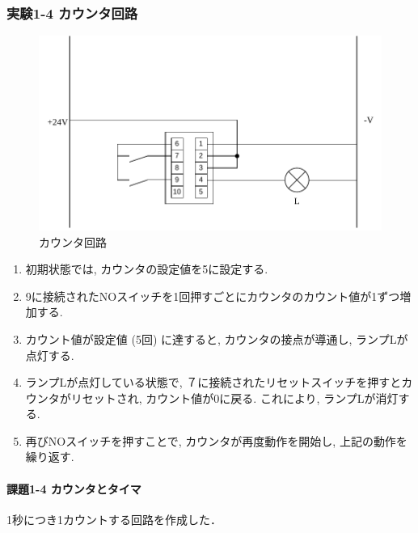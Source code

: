 \subsubsection{実験1-4 カウンタ回路}

\begin{figure}[H]
  \centering
  \includegraphics[scale=0.5]{sozai/3.pdf}
  \caption{カウンタ回路}
\end{figure}

\begin{enumerate}
  \item 初期状態では, カウンタの設定値を5に設定する.
  \item 9に接続されたNOスイッチを1回押すごとにカウンタのカウント値が1ずつ増加する.
  \item カウント値が設定値 (5回) に達すると, カウンタの接点が導通し, ランプLが点灯する.
  \item ランプLが点灯している状態で, ７に接続されたリセットスイッチを押すとカウンタがリセットされ, カウント値が0に戻る. これにより, ランプLが消灯する.
  \item 再びNOスイッチを押すことで, カウンタが再度動作を開始し, 上記の動作を繰り返す.
\end{enumerate}


\paragraph{課題1-4 カウンタとタイマ}
1秒につき1カウントする回路を作成した．

